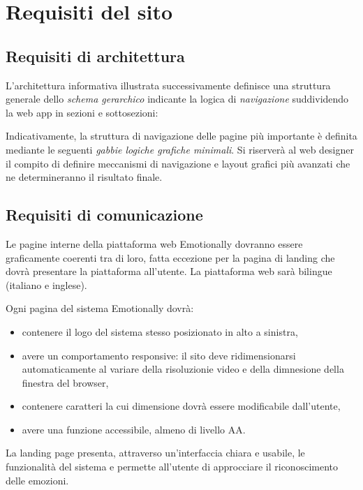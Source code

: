 
\chapter{Requisiti del sito}\label{chap:requisiti-del-sito}

\section{Requisiti di architettura}\label{sec:requisiti-di-architettura}

L'architettura informativa illustrata successivamente definisce una struttura 
generale dello \textit{schema gerarchico} indicante la logica di 
\textit{navigazione} suddividendo la web app in sezioni e sottosezioni:


Indicativamente, la struttura di navigazione delle pagine più importante è 
definita mediante le seguenti \textit{gabbie logiche grafiche minimali}. Si 
riserverà al web designer il compito di definire meccanismi di navigazione e 
layout grafici più avanzati che ne determineranno il risultato finale.


\section{Requisiti di comunicazione}\label{sec:requisiti-di-comunicazione}
Le pagine interne della piattaforma web Emotionally dovranno essere 
graficamente coerenti tra di loro, fatta eccezione per la pagina di landing che 
dovrà presentare la piattaforma all'utente. La piattaforma web sarà bilingue 
(italiano e inglese).

Ogni pagina del sistema Emotionally dovrà:
\begin{itemize}
	\item contenere il logo del sistema stesso posizionato in alto a sinistra,
	\item avere un comportamento responsive: il sito deve ridimensionarsi 
	automaticamente al variare della risoluzionie video e della dimnesione 
	della finestra del browser,
	\item contenere caratteri la cui dimensione dovrà essere modificabile 
	dall'utente,
	\item avere una funzione accessibile, almeno di livello AA.
\end{itemize}
La landing page presenta, attraverso un'interfaccia chiara e usabile, le 
funzionalità del sistema e permette all'utente di approcciare il riconoscimento 
delle emozioni. 

